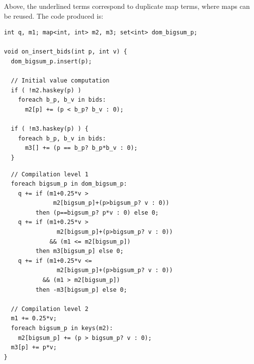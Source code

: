 Above, the underlined terms correspond to duplicate map terms, where maps can be
reused. The code produced is:

\begin{Verbatim}
int q, m1; map<int, int> m2, m3; set<int> dom_bigsum_p;

void on_insert_bids(int p, int v) {
  dom_bigsum_p.insert(p);

  // Initial value computation
  if ( !m2.haskey(p) )
    foreach b_p, b_v in bids:
      m2[p] += (p < b_p? b_v : 0);

  if ( !m3.haskey(p) ) {
    foreach b_p, b_v in bids:
      m3[] += (p == b_p? b_p*b_v : 0);
  }
\end{Verbatim}

\begin{Verbatim}
  // Compilation level 1
  foreach bigsum_p in dom_bigsum_p:
    q += if (m1+0.25*v >
              m2[bigsum_p]+(p>bigsum_p? v : 0))
         then (p==bigsum_p? p*v : 0) else 0;
    q += if (m1+0.25*v >
               m2[bigsum_p]+(p>bigsum_p? v : 0))
             && (m1 <= m2[bigsum_p])
         then m3[bigsum_p] else 0;
    q += if (m1+0.25*v <=
               m2[bigsum_p]+(p>bigsum_p? v : 0))
           && (m1 > m2[bigsum_p])
         then -m3[bigsum_p] else 0;

  // Compilation level 2
  m1 += 0.25*v;
  foreach bigsum_p in keys(m2):
    m2[bigsum_p] += (p > bigsum_p? v : 0);
  m3[p] += p*v;
}
\end{Verbatim}


